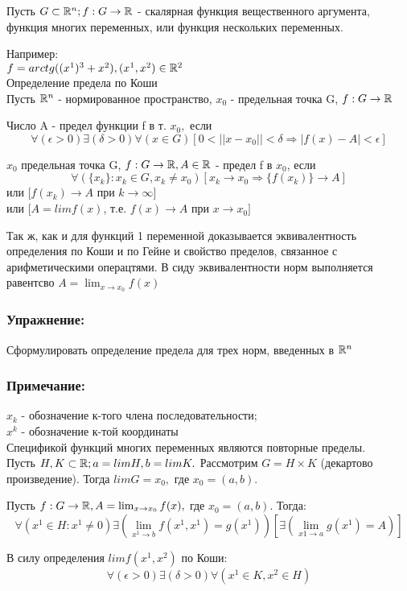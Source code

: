 \begin{opred}
Пусть $G\subset\mathbb{R}^n; f:G\to\mathbb{R}$ - скалярная функция вещественного аргумента, функция многих переменных, или функция нескольких переменных.
\end{opred}
Например:
\\
$f = arctg((x^1)^3+x^2), (x^1,x^2)\in\mathbb{R}^2$
\\
Определение предела по Коши
\\
Пусть $\mathbb{R}^n$ - нормированное пространство, $x_0$ - предельная точка G, $f:G\to\mathbb{R}$

\begin{opred}
Число A - предел функции f в т. $x_0,$ если
$$
\forall(\epsilon>0)\exists(\delta>0)\forall(x\in G)[0<||x-x_0||<\delta\Rightarrow|f(x)-A|<\epsilon]
$$
\end{opred}

\begin{opred}
$x_0$ предельная точка G, $f:G\to\mathbb{R}, A\in\mathbb{R}$ - предел f в $x_0$, если
$$
\forall(\{x_k\}:x_k\in G, x_k\ne x_0)[x_k\to x_0\Rightarrow\{f(x_k)\}\to A]
$$
или $[f(x_k)\to A$ при $k\to\infty]$
\\
или $[A=lim f(x)$, т.е. $f(x)\to A$ при $x\to x_0]$
\end{opred}
Так ж, как и для функций 1 переменной доказывается эквивалентность определения по Коши и по Гейне и свойство пределов, связанное с арифметическими операцтями. В сиду эквивалентности норм выполняется равентсво $A=\lim_{x\to x_0} f(x)$

\subsubsection{Упражнение:}
Сформулировать определение предела для трех норм, введенных в $\mathbb{R}^n$

\subsubsection{Примечание:}
$x_k$ - обозначение к-того члена последовательности;
\\
$x^k$ - обозначение к-той координаты
\\
Спецификой функций многих переменных являются повторные пределы.
\\
Пусть $H,K\subset\mathbb{R}; a=lim H, b=lim K.$ Рассмотрим $G=H\times K$ (декартово произведение). Тогда $lim G= x_0,$ где $x_0=(a,b)$.

\begin{teorema}
Пусть $f:G\to\mathbb{R}, A=\lim_{x\to x_0} f(x),$ где $x_0=(a,b).$ Тогда:
$$
\forall(x^1\in H:x^1\ne 0)\exists(\lim_{x^1\to b}f(x^1,x^1)=g(x^1))[\exists(\lim_{x1\to a} g(x^1)=A)]
$$
\end{teorema}
\dokvo
В силу определения $lim f(x^1,x^2)$ по Коши:
$$
\forall(\epsilon>0)\exists(\delta>0)\forall(x^1\in K, x^2\in H)
$$

